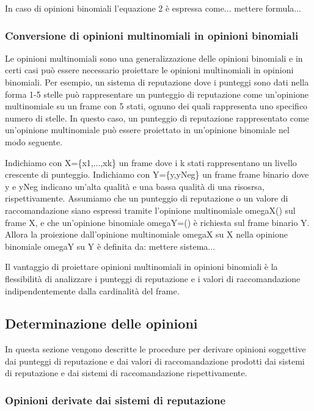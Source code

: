 \documentclass{report}
\begin{document}
	In caso di opinioni binomiali l'equazione 2 è espressa come... mettere
	formula...
	
	\hypertarget{header-n89}{%
		\subsubsection{Conversione di opinioni multinomiali in opinioni
			binomiali}\label{header-n89}}
	
	Le opinioni multinomiali sono una generalizzazione delle opinioni
	binomiali e in certi casi può essere necessario proiettare le opinioni
	multinomiali in opinioni binomiali. Per esempio, un sistema di
	reputazione dove i punteggi sono dati nella forma 1-5 stelle può
	rappresentare un punteggio di reputazione come un'opinione multinomiale
	su un frame con 5 stati, ognuno dei quali rappresenta uno specifico
	numero di stelle. In questo caso, un punteggio di reputazione
	rappresentato come un'opinione multinomiale può essere proiettato in
	un'opinione binomiale nel modo seguente.
	
	Indichiamo con X=\{x1,...,xk\} un frame dove i k stati rappresentano un
	livello crescente di punteggio. Indichiamo con Y=\{y,yNeg\} un frame
	frame binario dove y e yNeg indicano un'alta qualità e una bassa qualità
	di una risosrsa, rispettivamente. Assumiamo che un punteggio di
	reputazione o un valore di raccomandazione siano espressi tramite
	l'opinione multinomiale omegaX() sul frame X, e che un'opinione
	binomiale omegaY=() è richiesta sul frame binario Y. Allora la
	proiezione dall'opinione multinomiale omegaX su X nella opinione
	binomiale omegaY su Y è definita da: mettere sistema...
	
	Il vantaggio di proiettare opinioni multinomiali in opinioni binomiali è
	la flessibilità di analizzare i punteggi di reputazione e i valori di
	raccomandazione indipendentemente dalla cardinalità del frame.
	
	\hypertarget{header-n96}{%
		\subsection{Determinazione delle opinioni}\label{header-n96}}
	
	In questa sezione vengono descritte le procedure per derivare opinioni
	soggettive dai punteggi di reputazione e dai valori di raccomandazione
	prodotti dai sistemi di reputazione e dai sistemi di raccomandazione
	rispettivamente.
	
	\hypertarget{header-n99}{%
		\subsubsection{Opinioni derivate dai sistemi di
			reputazione}\label{header-n99}}
	
\end{document}
